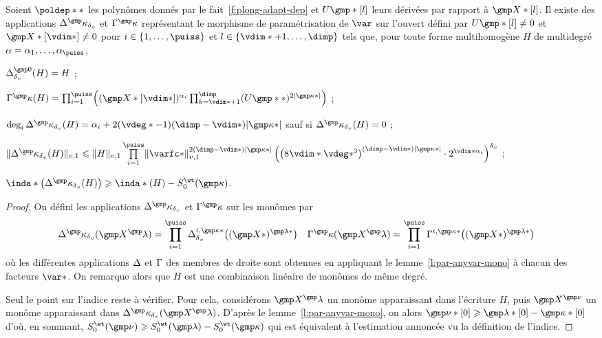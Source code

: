 \begin{lem} \label{l:par-var}
  Soient \( \poldep** \) les polynômes donnés par le
  fait~\ref{f:plong-adapt-dep} et \( \pden\mexp*[\indi] \) leurs dérivées par
  rapport à \( \vmp*[\indi] \).  Il existe des applications \(
    \pmnum^\dermp_\dv \) et \( \pmden^\dermp \) représentant le morphisme de
  paramétrisation de \( \var \) sur l'ouvert défini par \( \pden\mexp*[\indi]
    \neq 0 \) et \( \vmp*[\vdim*] \neq 0 \) pour \( \fct \in \set{1, \dots,
      \puiss} \) et \( \indi \in \set{\vdim*+1, \dots, \dimp} \) tels que,
  pour toute forme multihomogène \( H \) de multidegré \( \alpha = \alpha_1,
    \dots, \alpha_\puiss \),
  \begin{enumthm}
    \item \( \pmnum^{\gmp 0}_\dv (H) = H \) ;
    \item \(
        \pmden^\dermp(H)
        =
        \prod\fctrange \Bigl(
          (\vmp*[\vdim*])^{\alpha_\fct}
          \prod_{\ind=\vdim*+1}^{\dimp} (\pden\mexp**)^{2\lgr{\dermp*}}
        \Bigr)
      \) ;
    \item \(
        \deg_\fct \pmnum^\dermp_\dv (H)
        =
        \alpha_\fct
        + 2 (\vdeg* - 1) (\dimp - \vdim*) \lgr{\dermp*}
      \) sauf si \( \pmnum^\dermp_\dv (H) = 0 \) ;
    \item \(
        \nv1{ \pmnum^\dermp_\dv (H) }
        \le
        \nv1 H
        \prod\limits\fctrange
        \nv1{ \varfc* }^{ 2 (\dimp - \vdim*) \lgr{\dermp*} }
        \left(
          \bigl( 8 \vdim* \vdeg*^3 \bigr)^{(\dimp - \vdim*) \lgr{\dermp*}}
          \cdot 2^{ \vdim* \alpha_\fct }
        \right)^\dv
      \) ;
    \item \( \inda* \bigl( \pmnum^\dermp_\dv (H) \bigr)
        \ge \inda*(H) - \wtsum*(\dermp) \).
  \end{enumthm}
\end{lem}

\begin{proof}
  On défini les applications \( \pmnum^\dermp_\dv \) et \( \pmden^\dermp \)
  sur les monômes par
  \begin{align}
    \pmnum^\dermp_\dv (\vmp^\imp)
    & =
    \prod\fctrange \pmnum^{\fct, \dermp*}_\dv \bigl( (\vmp*)^{\imp*} \bigr)
    &
    \pmden^\dermp (\vmp^\imp)
    & =
    \prod\fctrange \pmden^{\fct, \dermp*} \bigl( (\vmp*)^{\imp*} \bigr)
  \end{align}
  où les différentes applications \( \Delta \) et \( \Gamma \) des membres de
  droite sont obtenues en appliquant le lemme~\ref{l:par-anyvar-mono} à
  chacun des facteurs \( \var* \). On remarque alors que \( H \) est une
  combinaison linéaire de monômes de même degré.

  Seul le point sur l'indice reste à vérifier. Pour cela, considérons \(
    \vmp^\imp \) un monôme apparaissant dans l'écriture \( H \), puis \(
    \vmp^{\gmp\nu} \) un monôme apparaissant dans \( \pmnum^\dermp_\dv(
    \vmp^\imp ) \). D'après le lemme~\ref{l:par-anyvar-mono}, on alors \(
    \gmp\nu*[0] \ge \imp*[0] - \dermp*[0] \) d'où, en sommant, \(
    \wtsum*(\gmp\nu) \ge \wtsum*(\imp) - \wtsum*(\dermp) \) qui est équivalent
  à l'estimation annoncée vu la définition de l'indice.
\end{proof}


\endinput

